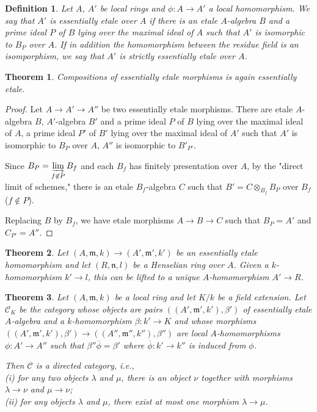 \documentclass{article}
\theoremstyle{theorem}
\newtheorem*{definition*}{Definition}
\newtheorem{theorem}{Theorem}[section]
\begin{document}
    \begin{definition*}
        Let $A$, $A'$ be local rings and $\phi : A \rightarrow A'$ a local homomorphism. We say that $A'$ is essentially etale over $A$ if there is an etale $A$-algebra $B$ and a prime ideal $P$ of $B$ lying over the maximal ideal of $A$ such that $A'$ is isomorphic to $B_P$ over $A$. If in addition the homomorphism between the residue field is an isomporphism, we say that $A'$ is strictly essentially etale over $A$.
    \end{definition*}
    
    \begin{theorem}
        Compositions of essentially etale morphisms is again essentially etale.
    \end{theorem}
    \begin{proof}
        Let $A \rightarrow A' \rightarrow A''$ be two essentially etale morphisms. There are etale $A$-algebra $B$, $A'$-algebra $B'$ and a prime ideal $P$ of $B$ lying over the maximal ideal of $A$, a prime ideal $P'$ of $B'$ lying over the maximal ideal of $A'$ such that $A'$ is isomorphic to $B_P$ over $A$, $A''$ is isomorphic to $B'_{P'}$.
        
        Since $\displaystyle B_P = \varinjlim_{f \not\in P} B_f$ and each $B_f$ has finitely presentation over $A$, by the "direct limit of schemes," there is an etale $B_f$-algebra $C$ such that $B' = C \otimes_{B_f} B_P$ over $B_f$ ($f \not\in P$).
        
        Replacing $B$ by $B_f$, we have etale morphisms $A \rightarrow B \rightarrow C$ such that $B_P = A'$ and $C_{P'} = A''$.
    \end{proof}
    
    \begin{theorem}
        Let $(A, \mathfrak{m}, k) \rightarrow (A', \mathfrak{m}', k')$ be an essentially etale homomorphism and let $(R, \mathfrak{n}, l)$ be a Henselian ring over $A$. Given a $k$-homomorphism $k' \rightarrow l$, this can be lifted to a unique $A$-homomorphism $A'\rightarrow R$.
    \end{theorem}

    \begin{theorem}
        Let $(A, \mathfrak{m}, k)$ be a local ring and let $K/k$ be a field extension. Let $\mathcal{C}_K$ be the category whose objects are pairs $((A', \mathfrak{m'}, k'), \beta')$ of essentially etale $A$-algebra and a $k$-homomorphism $\beta:k' \rightarrow K$ and whose morphisms $((A', \mathfrak{m'}, k'), \beta') \rightarrow ((A'', \mathfrak{m''}, k''), \beta'')$ are local $A$-homomorphisms $\phi : A' \rightarrow A''$ such that $\beta'' \overline{\phi} = \beta'$ where $\overline\phi : k' \rightarrow k''$ is induced from $\phi$.
        
        Then $\mathcal{C}$ is a directed category, i.e.,\\
        {\rm (i)} for any two objects $\lambda$ and $\mu$, there is an object $\nu$ together with morphisms $\lambda \rightarrow \nu$ and $\mu \rightarrow \nu$;\\
        {\rm (ii)} for any objects $\lambda$ and $\mu$, there exist at most one morphism $\lambda \rightarrow \mu$.
    \end{theorem}
    
\end{document}
